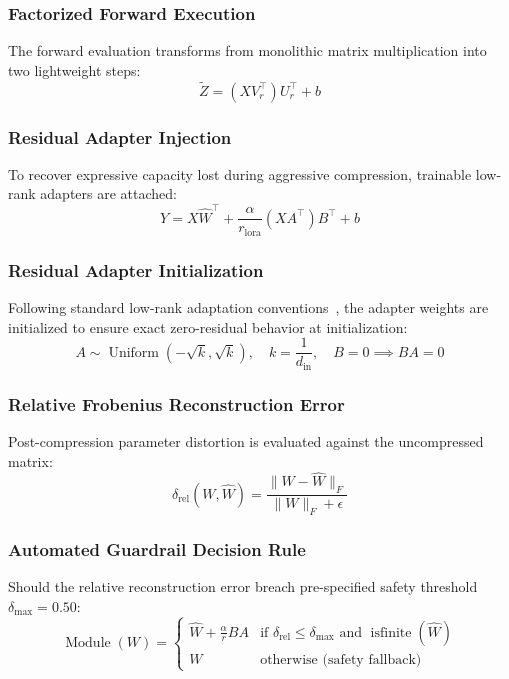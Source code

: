 \subsubsection{Factorized Forward Execution}
The forward evaluation transforms from monolithic matrix multiplication into two lightweight steps:
\begin{equation}
\tilde{Z} = (X V_r^\top) U_r^\top + b
\end{equation}

\subsubsection{Residual Adapter Injection}
To recover expressive capacity lost during aggressive compression, trainable low-rank adapters are attached:
\begin{equation}
Y = X \hat{W}^\top + \frac{\alpha}{r_{\text{lora}}} (X A^\top) B^\top + b
\end{equation}

\subsubsection{Residual Adapter Initialization}
Following standard low-rank adaptation conventions~\citep{hu2022lora}, the adapter weights are initialized to ensure exact zero-residual behavior at initialization:
\begin{equation}
A \sim \operatorname{Uniform}(-\sqrt{k}, \sqrt{k}), \quad k = \frac{1}{d_{\text{in}}}, \quad B = 0 \implies B A = 0
\end{equation}

\subsubsection{Relative Frobenius Reconstruction Error}
Post-compression parameter distortion is evaluated against the uncompressed matrix:
\begin{equation}
\delta_{\text{rel}}(W, \hat{W}) = \frac{\|W - \hat{W}\|_F}{\|W\|_F + \epsilon}
\end{equation}

\subsubsection{Automated Guardrail Decision Rule}
Should the relative reconstruction error breach pre-specified safety threshold $\delta_{\text{max}} = 0.50$:
\begin{equation}
\operatorname{Module}(W) = \begin{cases} \hat{W} + \frac{\alpha}{r} B A & \text{if } \delta_{\text{rel}} \le \delta_{\text{max}} \text{ and } \operatorname{isfinite}(\hat{W}) \\ W & \text{otherwise (safety fallback)} \end{cases}
\end{equation}

